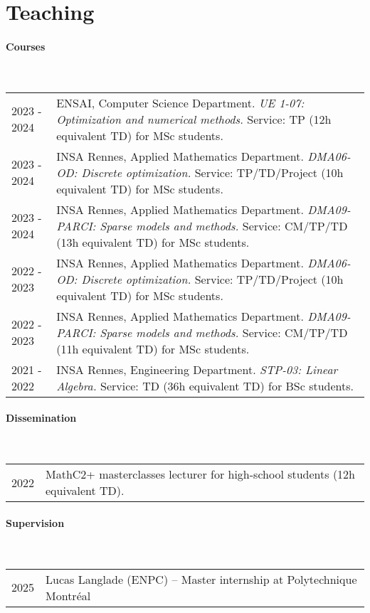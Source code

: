 \section{Teaching}

\paragraph{Courses}~\\

\begin{longtable}[l]{@{}p{}p{}}
    2023 - 2024 & ENSAI, Computer Science Department. \textit{UE 1-07: Optimization and numerical methods.} Service: TP (12h equivalent TD) for MSc students. \\
    2023 - 2024 & INSA Rennes, Applied Mathematics Department. \textit{DMA06-OD: Discrete optimization.} Service: TP/TD/Project (10h equivalent TD) for MSc students. \\
    2023 - 2024 & INSA Rennes, Applied Mathematics Department. \textit{DMA09-PARCI: Sparse models and methods.} Service: CM/TP/TD (13h equivalent TD) for MSc students. \\
    2022 - 2023 & INSA Rennes, Applied Mathematics Department. \textit{DMA06-OD: Discrete optimization.} Service: TP/TD/Project (10h equivalent TD) for MSc students. \\
    2022 - 2023 & INSA Rennes, Applied Mathematics Department. \textit{DMA09-PARCI: Sparse models and methods.} Service: CM/TP/TD (11h equivalent TD) for MSc students. \\
    2021 - 2022 & INSA Rennes, Engineering Department. \textit{STP-03: Linear Algebra.} Service: TD (36h equivalent TD) for BSc students. \\
\end{longtable}

\paragraph{Dissemination}~\\

\begin{longtable}[l]{@{}p{} p{}}
    2022 & MathC2+ masterclasses lecturer for high-school students (12h equivalent TD).
\end{longtable}

\paragraph{Supervision}~\\

\begin{longtable}[l]{@{}p{} p{}}
    2025 & Lucas Langlade (ENPC) -- Master internship at Polytechnique Montréal
\end{longtable}